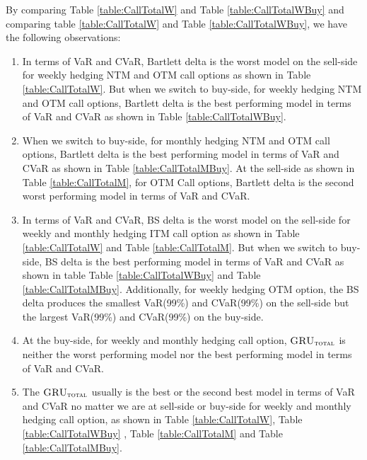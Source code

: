 \documentclass[letterpaper,12pt,titlepage,oneside,final]{book}
\numberwithin{equation}{section}
\theoremstyle{definition}
\newcommand{\modelT}{\textsc{GRU}_{\textsc{total}}}
\begin{document}
By comparing Table \ref{table:CallTotalW} and Table \ref{table:CallTotalWBuy} and  comparing table \ref{table:CallTotalW} and Table \ref{table:CallTotalWBuy}, we have the  following observations:
\begin{enumerate}
	\item In terms of VaR and CVaR, Bartlett delta is the worst model on the sell-side for weekly  hedging NTM and OTM call options as shown in Table \ref{table:CallTotalW}. But when we  switch to buy-side, for weekly hedging NTM and OTM call options, Bartlett delta is the best performing  model in terms of VaR and CVaR as shown in Table \ref{table:CallTotalWBuy}.
	
	\item  When we  switch to buy-side, for monthly hedging NTM and OTM call options, Bartlett delta is the best performing  model in terms of VaR and CVaR as shown in Table \ref{table:CallTotalMBuy}. At the sell-side as shown in  Table \ref{table:CallTotalM}, for OTM Call options, Bartlett delta is the second worst performing model in terms of VaR and CVaR.
	
	\item In terms of VaR and CVaR, BS delta is the worst model on the sell-side for weekly  and monthly hedging ITM call option as shown in Table \ref{table:CallTotalW} and Table \ref{table:CallTotalM}. But when we switch to buy-side,   BS delta is the best performing  model in terms of VaR and CVaR as shown in table  Table \ref{table:CallTotalWBuy} and Table \ref{table:CallTotalMBuy}. Additionally, for weekly hedging OTM option, the BS delta produces the smallest VaR(99\%) and CVaR(99\%) on the sell-side but the largest VaR(99\%) and CVaR(99\%) on the buy-side.
	\item At the buy-side, for weekly and monthly hedging call option, $\modelT$  is neither the worst performing model nor the best performing model in terms of VaR and CVaR. 
	\item The $\modelT$ usually is the best or the second best model in terms of VaR and CVaR no matter we are at sell-side or buy-side for weekly and monthly hedging call option,  as shown in Table \ref{table:CallTotalW}, Table \ref{table:CallTotalWBuy} , Table \ref{table:CallTotalM} and Table \ref{table:CallTotalMBuy}.
\end{enumerate}
\end{document}
